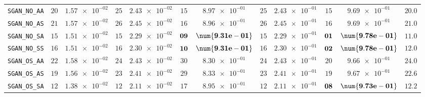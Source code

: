 \begin{xltabular}{\textwidth}{l||cC|cC|cC|cC|cC||c}
	\texttt{SGAN\_NO\_AA} & $ 20$ & $ \num{1.57e-02}$ & $ 25$ & $ \num{2.43e-02}$ & $ 15$ & $ \num{8.97e-01}$ & $ 25$ & $ \num{2.43e-01}$ & $ 15$ & $ \num{9.69e-01}$ & $ 20.0$  \\
	\texttt{SGAN\_NO\_AS} & $ 21$ & $ \num{1.57e-02}$ & $ 26$ & $ \num{2.45e-02}$ & $ 16$ & $ \num{8.96e-01}$ & $ 26$ & $ \num{2.45e-01}$ & $ 16$ & $ \num{9.69e-01}$ & $ 21.0$  \\
	\texttt{SGAN\_NO\_SA} & $ 15$ & $ \num{1.51e-02}$ & $ 15$ & $ \num{2.29e-02}$ & $\bf 09$ & $\bf \num{9.31e-01}$ & $ 15$ & $ \num{2.29e-01}$ & $\bf 01$ & $\bf \num{9.78e-01}$ & $ 11.0$  \\
	\texttt{SGAN\_NO\_SS} & $ 16$ & $ \num{1.51e-02}$ & $ 16$ & $ \num{2.30e-02}$ & $\bf 10$ & $\bf \num{9.31e-01}$ & $ 16$ & $ \num{2.30e-01}$ & $\bf 02$ & $\bf \num{9.78e-01}$ & $ 12.0$  \\
	\texttt{SGAN\_OS\_AA} & $ 22$ & $ \num{1.58e-02}$ & $ 24$ & $ \num{2.43e-02}$ & $ 30$ & $ \num{8.30e-01}$ & $ 24$ & $ \num{2.43e-01}$ & $ 20$ & $ \num{9.66e-01}$ & $ 24.0$  \\
	\texttt{SGAN\_OS\_AS} & $ 19$ & $ \num{1.56e-02}$ & $ 23$ & $ \num{2.41e-02}$ & $ 29$ & $ \num{8.33e-01}$ & $ 23$ & $ \num{2.41e-01}$ & $ 19$ & $ \num{9.67e-01}$ & $ 22.6$  \\
	\texttt{SGAN\_OS\_SA} & $ 12$ & $ \num{1.38e-02}$ & $ 12$ & $ \num{2.11e-02}$ & $ 17$ & $ \num{8.95e-01}$ & $ 12$ & $ \num{2.11e-01}$ & $\bf 08$ & $\bf \num{9.73e-01}$ & $ 12.2$  \\

\end{xltabular}
